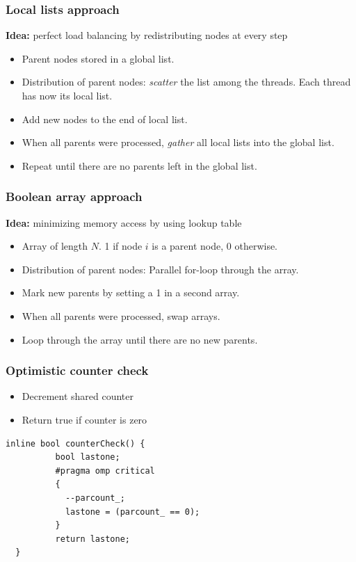 \begin{frame}
 \frametitle{Local lists approach}
 \textbf{Idea:} perfect load balancing by redistributing nodes at every step
  \begin{itemize}
  \item Parent nodes stored in a global list.
  \item Distribution of parent nodes: \emph{scatter} the list among the threads. Each thread has now its local list.
  \item Add new nodes to the end of local list.
  \item When all parents were processed, \emph{gather} all local lists into the global list.
  \item Repeat until there are no parents left in the global list.
  \end{itemize}
\end{frame}

\begin{frame}
 \frametitle{Boolean array approach}
 \textbf{Idea:} minimizing memory access by using lookup table 
 \begin{itemize}
  \item Array of length $N$. 1 if node $i$ is a parent node, 0 otherwise.
  \item Distribution of parent nodes: Parallel for-loop through the array.
  \item Mark new parents by setting a 1 in a second array.
  \item When all parents were processed, swap arrays.
  \item Loop through the array until there are no new parents.
 \end{itemize}
\end{frame}

\begin{frame}[fragile]
 \frametitle{Optimistic counter check}
 \begin{itemize}
  \item Decrement shared counter
  \item Return true if counter is zero
 \end{itemize}
 \begin{lstlisting}[style=cpp]
  inline bool counterCheck() {
          bool lastone;
          #pragma omp critical
          {
            --parcount_;
            lastone = (parcount_ == 0);
          }
          return lastone;
  }
 \end{lstlisting}
\end{frame}

